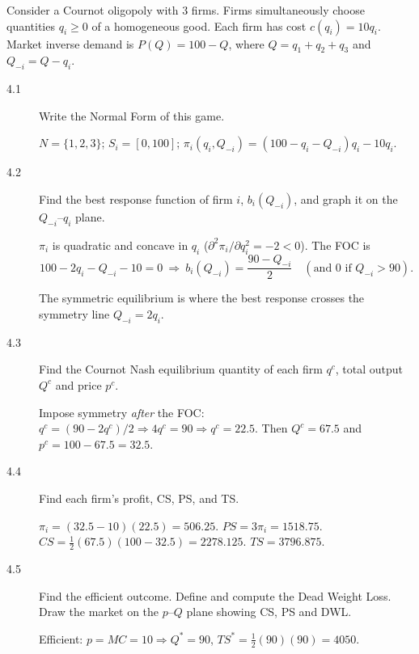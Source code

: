\noindent Consider a Cournot oligopoly with $3$ firms. Firms simultaneously choose quantities $q_i\ge0$ of a homogeneous good. Each firm has cost $c(q_i)=10q_i$. Market inverse demand is $P(Q)=100-Q$, where $Q=q_1+q_2+q_3$ and $Q_{-i}=Q-q_i$.

\begin{description}
\item[4.1] Write the Normal Form of this game.
\begin{solution}
$N=\{1,2,3\}$; $S_i=[0,100]$; $\pi_i(q_i,Q_{-i})=(100-q_i-Q_{-i})q_i-10q_i$.
\end{solution}
\item[4.2] Find the best response function of firm $i$, $b_i(Q_{-i})$, and graph it on the $Q_{-i}$--$q_i$ plane.
\begin{solution}
$\pi_i$ is quadratic and concave in $q_i$ ($\partial^2\pi_i/\partial q_i^2=-2<0$). The FOC is
\[100-2q_i-Q_{-i}-10=0\ \Longrightarrow\ b_i(Q_{-i})=\frac{90-Q_{-i}}{2}\quad(\text{and }0\text{ if }Q_{-i}>90).\]
\begin{center}
\end{center}
The symmetric equilibrium is where the best response crosses the symmetry line $Q_{-i}=2q_i$.
\end{solution}
\item[4.3] Find the Cournot Nash equilibrium quantity of each firm $q^c$, total output $Q^c$ and price $p^c$.
\begin{solution}
Impose symmetry \emph{after} the FOC: $q^c=(90-2q^c)/2\Rightarrow 4q^c=90\Rightarrow q^c=22.5$. Then $Q^c=67.5$ and $p^c=100-67.5=32.5$.
\end{solution}
\item[4.4] Find each firm's profit, CS, PS, and TS.
\begin{solution}
$\pi_i=(32.5-10)(22.5)=506.25$. $PS=3\pi_i=1518.75$. $CS=\tfrac12(67.5)(100-32.5)=2278.125$. $TS=3796.875$.
\end{solution}
\item[4.5] Find the efficient outcome. Define and compute the Dead Weight Loss. Draw the market on the $p$--$Q$ plane showing CS, PS and DWL.
\begin{solution}
Efficient: $p=MC=10\Rightarrow Q^*=90$, $TS^*=\tfrac12(90)(90)=4050$.


\end{solution}
\end{description}
